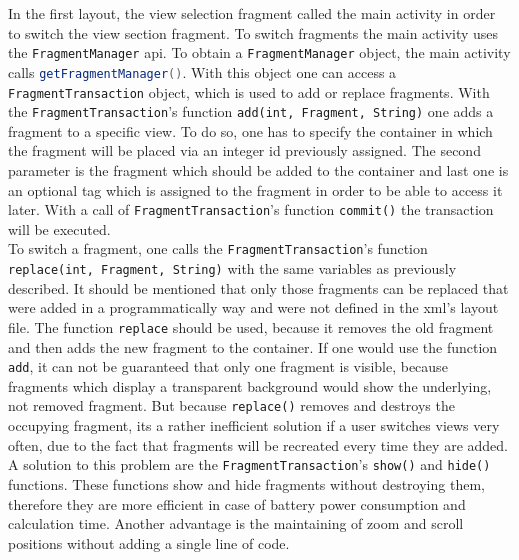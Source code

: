 In  the first layout, the view selection fragment called the main activity in order to switch the view section fragment. To switch fragments the main activity uses the \lstinline{FragmentManager} api. To obtain a \lstinline{FragmentManager} object, the main activity calls \lstinline[language=Java]$getFragmentManager()$. With this object one can access a \lstinline{FragmentTransaction} object, which is used to add or replace fragments. With the \lstinline{FragmentTransaction}'s function \lstinline$add(int, Fragment, String)$ one adds a fragment to a specific view. To do so, one has to specify the container in which the fragment will be placed via an integer id previously assigned. The second parameter is the fragment which should be added to the container and last one is an optional tag which is assigned to the fragment in order to be able to access it later. With a call of \lstinline{FragmentTransaction}'s function \lstinline$commit()$ the transaction will be executed.\\
To switch a fragment, one calls the \lstinline{FragmentTransaction}'s function \lstinline$replace(int, Fragment, String)$ with the same variables as previously described. It should be mentioned that only those fragments can be replaced that were added in a programmatically way and were not defined in the xml's layout file. 
The function \lstinline$replace$ should be used, because it removes the old fragment and then adds the new fragment to the container. If one would use the function \lstinline$add$, it can not be guaranteed that only one fragment is visible, because fragments which display a transparent background would show the underlying, not removed fragment. But because \lstinline$replace()$ removes and destroys the occupying fragment, its a rather inefficient solution if a user switches views very often, due to the fact that fragments will be recreated every time they are added.\\
A solution to this problem are the \lstinline{FragmentTransaction}'s \lstinline$show()$ and \lstinline$hide()$ functions. These functions show and hide fragments without destroying them, therefore they are more efficient in case of battery power consumption and calculation time. Another advantage is the maintaining of zoom and scroll positions without adding a single line of code.

